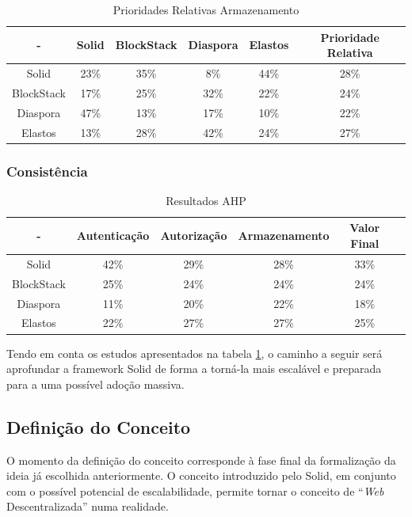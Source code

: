 \begin{table}[H]
\centering
\caption{Prioridades Relativas Armazenamento}
\vspace{0.5cm}
\begin{tabular}{c|c|c|c|c|c} 
 - & Solid & BlockStack & Diaspora & Elastos & Prioridade Relativa \\
\hline                               
Solid & 23\% & 35\% & 8\% & 44\% & 28\% \\
BlockStack &  17\% & 25\%	& 32\%	& 22\%	& 24\% \\
Diaspora &  47\% &	13\% & 17\%	& 10\% & 22\% \\
Elastos & 13\% & 28\% & 42\% & 24\% & 27\% \\
\end{tabular}
\end{table}

\subsubsection{Consistência}

\begin{table}[h]
\centering
\caption{Resultados \acrshort{AHP}}
\label{tabela_resultados_ahp}
\vspace{0.5cm}
\begin{tabular}{c|c|c|c|c|c} 
 - & Autenticação & Autorização & Armazenamento & Valor Final & \\
\hline                               
Solid & 42\% &	29\% & 28\%	& 33\% & \\
BlockStack &  25\% & 24\% & 24\% & 24\% & \\
Diaspora &  11\% &	20\% & 22\% & 18\% & \\
Elastos & 22\% & 27\% & 27\% & 25\% & \\
\end{tabular}
\end{table}

Tendo em conta os estudos apresentados na tabela \ref{tabela_resultados_ahp}, o caminho a seguir será aprofundar a framework Solid de forma a torná-la mais escalável e preparada para a uma possível adoção massiva.

\subsection{Definição do Conceito}
O momento da definição do conceito corresponde à fase final da formalização da ideia já escolhida anteriormente. O conceito introduzido pelo Solid, em conjunto com o possível potencial de escalabilidade, permite tornar o conceito de “\emph{Web} Descentralizada” numa realidade.

